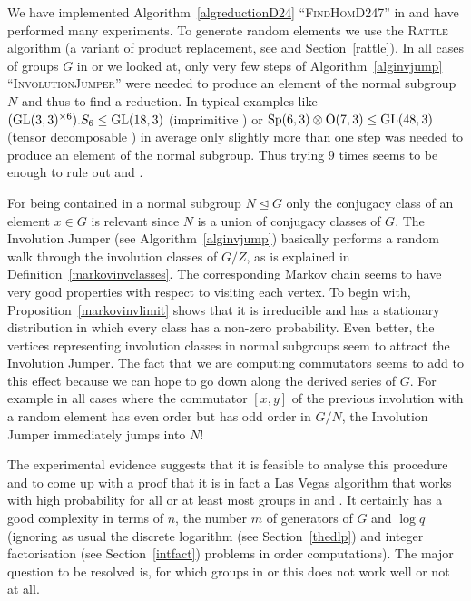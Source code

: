 \begin{Obs}
%
We have implemented Algorithm~\ref{algreductionD24}
``\textsc{FindHomD247}'' in {\GAP} and have
performed many experiments. To generate random elements we use the
\textsc{Rattle} algorithm (a variant of product replacement, see
%
\cite{LGMurray, LGO97} and Section~\ref{rattle}). 
In all cases of groups $G$ in  or  we
looked at, only very few steps of Algorithm~\ref{alginvjump}
``\textsc{InvolutionJumper}'' were needed to produce an element of the
normal subgroup $N$ and thus to find a reduction. In typical examples
like $(\GL(3,3)^{\times 6}).S_6 \le \GL(18,3)$ (imprimitive ) or $\Sp(6,3)
\otimes \mathrm{O}(7,3) \le \GL(48,3)$ (tensor decomposable ) 
in average only slightly more than one
step was needed to produce an element of the normal subgroup. Thus trying
$9$ times seems to be enough to rule out  and .
\end{Obs}

\begin{Expl}
%
For being contained in a normal subgroup $N \unlhd G$ only the
conjugacy class of an element $x \in G$ is relevant since $N$ is a union of
conjugacy classes of $G$. The Involution Jumper (see Algorithm~\ref{alginvjump}) 
basically performs a random walk through the involution classes of $G/Z$,
as is explained in Definition~\ref{markovinvclasses}. 
The corresponding Markov chain seems to have very good properties with
respect to visiting each vertex. 
To begin with, Proposition~\ref{markovinvlimit} shows that it is irreducible
and has a stationary distribution in which every class has a non-zero 
probability. Even better, the vertices representing
involution classes in normal subgroups seem to attract the Involution
Jumper. The fact that we are computing commutators seems to add to this
effect because we can hope to go down along the derived series of $G$.
For example in all cases where the commutator $[x,y]$ of the previous
involution with a random element has even order but has odd order in
$G/N$, the Involution Jumper immediately jumps into $N$!

The experimental evidence suggests that it is feasible to analyse this
procedure and to come up with a proof that it is in fact a Las Vegas
algorithm that works with high probability for all or at least most groups
in  and . It certainly has a good complexity in terms of $n$, the
number $m$ of generators of $G$ and $\log q$ (ignoring as usual the
discrete logarithm (see Section~\ref{thedlp}) and integer factorisation 
(see Section~\ref{intfact}) problems in order computations). 
The major question to be
resolved is, for which groups in  or  this
does not work well or not at all.
\end{Expl}

